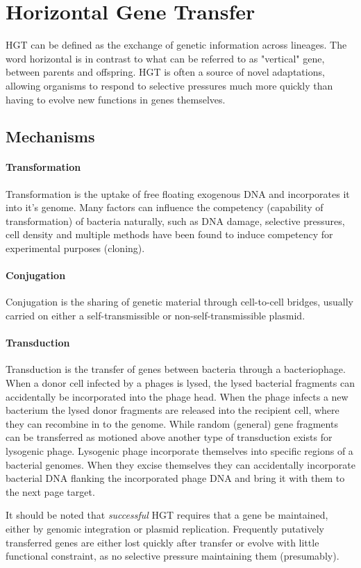 \documentclass[12pt,letter]{article}
\begin{document}
\section{Horizontal Gene Transfer}
HGT can be defined as the exchange of genetic information across lineages\citep{lgt}.
The word horizontal is in contrast to what can be referred to as "vertical" gene, between parents and offspring\citep{ihgt}.
HGT is often a source of novel adaptations, allowing organisms to respond to selective pressures much more quickly than having to evolve new functions in genes themselves\citep{ihgt}.\par
\subsection{Mechanisms}
\paragraph{Transformation}
Transformation is the uptake of free floating exogenous DNA and incorporates it into it's genome.
Many factors can influence the competency (capability of transformation) of bacteria naturally, such as DNA damage, selective pressures, cell density and multiple methods have been found to induce competency for experimental purposes (cloning)\citep{natcomp}.
\paragraph{Conjugation}
Conjugation is the sharing of genetic material through cell-to-cell bridges, usually carried on either a self-transmissible or non-self-transmissible plasmid\citep{conjug}.
\paragraph{Transduction}
Transduction is the transfer of genes between bacteria through a bacteriophage\citep{transd}.
When a donor cell infected by a phages is lysed, the lysed bacterial fragments can accidentally be incorporated into the phage head\citep{transd}.
When the phage infects a new bacterium the lysed donor fragments are released into the recipient cell, where they can recombine in to the genome\citep{transd}.
While random (general) gene fragments can be transferred as motioned above another type of transduction exists for lysogenic phage\citep{transd}.
Lysogenic phage incorporate themselves into specific regions of a bacterial genomes\citep{transd}.
When they excise themselves they can accidentally incorporate bacterial DNA flanking the incorporated phage DNA and bring it with them to the next page target\citep{transd}.\par
It should be noted that \textit{successful} HGT requires that a gene be maintained, either by genomic integration or plasmid replication.
Frequently putatively transferred genes are either lost quickly after transfer or evolve with little functional constraint, as no selective pressure maintaining them (presumably)\citep{fastlane}.
\end{document}
